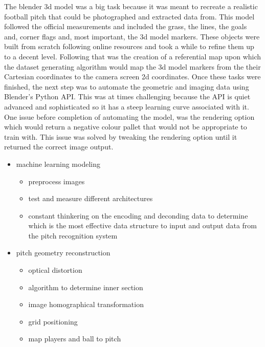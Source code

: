 \documentclass[
11pt,
twoside
]{report}
\begin{document}
The blender 3d model was a big task because it was meant to recreate a realistic football pitch that could be photographed and extracted data from. This model followed the official measurements and included the grass, the lines, the goals and, corner flags and, most important, the 3d model markers. These objects were built from scratch following online resources and took a while to refine them up to a decent level. Following that was the creation of a referential map upon which the dataset generating algorithm would map the 3d model markers from the their Cartesian coordinates to the camera screen 2d coordinates. Once these tasks were finished, the next step was to automate the geometric and imaging data using Blender's Python API. This was at times challenging because the API is quiet advanced and sophisticated so it has a steep learning curve associated with it. One issue before completion of automating the model, was the rendering option which would return a negative colour pallet that would not be appropriate to train with. This issue was solved by tweaking the rendering option until it returned the correct image output.


\begin{itemize}
\item
  machine learning modeling

  \begin{itemize}
  \item
    preprocess images
  \item
    test and measure different architectures
    \item
    constant thinkering on the encoding and deconding data to determine which is the most effective data structure to input and output data from the pitch recognition system
  \end{itemize}




\item
  pitch geometry reconstruction

  \begin{itemize}
  \item
    optical distortion
  \item
    algorithm to determine inner section
  \item
    image homographical transformation
  \item
    grid positioning
  \item
    map players and ball to pitch
  \end{itemize}
\end{itemize}
\end{document}
